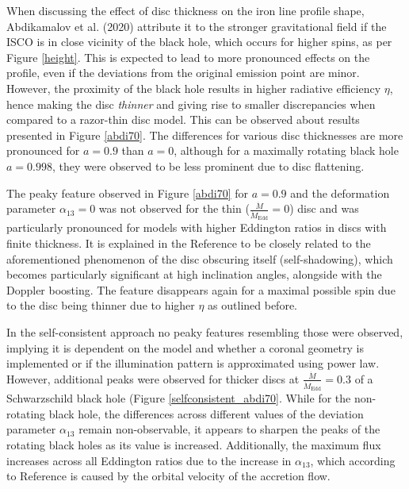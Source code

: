 \documentclass[fleqn,usenatbib,useAMS]{mnras}
\begin{document}



When discussing the effect of disc thickness on the iron line profile shape, Abdikamalov et al. (2020)\cite{abdikamalov2020testing} attribute it to the stronger gravitational field if the ISCO is in close vicinity of the black hole, which occurs for higher spins, as per Figure \ref{height}. This is expected to lead to more pronounced effects on the profile, even if the deviations from the original emission point are minor. However, the proximity of the black hole results in higher radiative efficiency $\eta$, hence making the disc \textit{thinner} and giving rise to smaller discrepancies when compared to a razor-thin disc model. This can be observed about results presented in Figure \ref{abdi70}. The differences for various disc thicknesses are more pronounced for $a = 0.9$ than $a = 0$, although for a maximally rotating black hole $a = 0.998$, they were observed to be less prominent due to disc flattening.

The peaky feature observed in Figure \ref{abdi70} for $a = 0.9$ and the deformation parameter $\alpha_{13} = 0$ was not observed for the thin ($\frac{\dot{M}}{\dot{M}_\text{Edd}} = 0$) disc and was particularly pronounced for models with higher Eddington ratios in discs with finite thickness. It is explained in the Reference \cite{abdikamalov2020testing} to be closely related to the aforementioned phenomenon of the disc obscuring itself (self-shadowing), which becomes particularly significant at high inclination angles, alongside with the Doppler boosting. The feature disappears again for a maximal possible spin due to the disc being thinner due to higher $\eta$ as outlined before. 

In the self-consistent approach no peaky features resembling those were observed, implying it is dependent on the model and whether a coronal geometry is implemented or if the illumination pattern is approximated using power law. However, additional peaks were observed for thicker discs at $\frac{\dot{M}}{\dot{M}_\text{Edd}} = 0.3$ of a Schwarzschild black hole (Figure \ref{selfconsistent_abdi70}. 
While for the non-rotating black hole, the differences across different values of the deviation parameter $\alpha_{13}$ remain non-observable, it appears to sharpen the peaks of the rotating black holes as its value is increased. Additionally, the maximum flux increases across all Eddington ratios due to the increase in $\alpha_{13}$, which according to Reference \cite{johannsen2014x} is caused by the orbital velocity of the accretion flow. 
\end{document}

